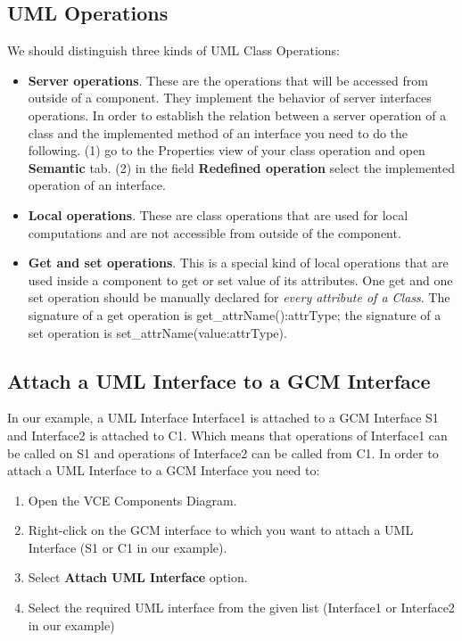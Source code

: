 \documentclass[12pt]{article}
\begin{document}
\subsection{UML Operations}
We should distinguish three kinds of UML Class Operations:
\begin{itemize}
\item
\textbf{Server operations}. These are the operations that will be accessed from outside of a component. They implement the behavior of server interfaces operations. In order to establish the relation between a server operation of a class and the implemented method of an interface you need to do the following. (1) go to the Properties view of your class operation and open \textbf{Semantic} tab. (2) in the field \textbf{Redefined operation} select the implemented operation of an interface.
\item
\textbf{Local operations}. These are class operations that are used for local computations and are not accessible from outside of the component.
\item
\textbf{Get and set operations}. This is a special kind of local operations that are used inside a component to get or set value of its attributes. One get and one set operation should be manually declared for \textit{every attribute of a Class}. The signature of a get operation is \textsf{get\_attrName():attrType}; the signature of a set operation is \textsf{set\_attrName(value:attrType)}.
\end{itemize}

\subsection{Attach a UML Interface to a GCM Interface}
In our example, a UML Interface Interface1 is attached to a GCM Interface S1 and Interface2 is attached to C1. Which means that operations of Interface1 can be called on S1 and operations of Interface2 can be called from C1. In order to attach a UML Interface to a GCM Interface you need to:
\begin{enumerate}
\item
Open the VCE Components Diagram.
\item
Right-click on the GCM interface to which you want to attach a UML Interface (S1 or C1 in our example).
\item
Select \textbf{Attach UML Interface} option.
\item
Select the required UML interface from the given list (Interface1 or Interface2 in our example)
\end{enumerate}
\end{document}
